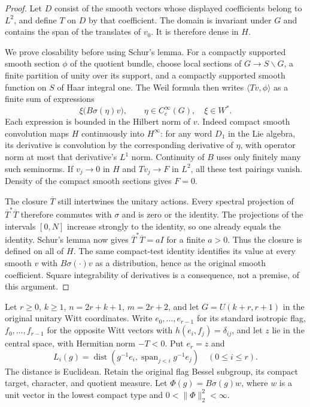 \begin{proof}
Let $D$ consist of the smooth vectors whose displayed coefficients
belong to $L^2$, and define $T$ on $D$ by that coefficient.
The domain is invariant under $G$ and contains the span of the
translates of $v_0$.  It is therefore dense in $H$.

We prove closability before using Schur's lemma.  For a compactly
supported smooth section $\phi$ of the quotient bundle, choose
local sections of $G\to S\backslash G$, a finite partition of
unity over its support, and a compactly supported smooth function
on $S$ of Haar integral one.  The Weil formula then writes
$\langle Tv,\phi\rangle$ as a finite sum of expressions
\[
                 \xi\bigl(B\sigma(\eta)v\bigr),
        \qquad \eta\in C_c^\infty(G),\quad \xi\in W^*.
\]
Each expression is bounded in the Hilbert norm of $v$.
Indeed compact smooth convolution maps $H$ continuously into
$H^\infty$: for any word $D_1$ in the Lie algebra, its derivative
is convolution by the corresponding derivative of $\eta$, with
operator norm at most that derivative's $L^1$ norm.  Continuity
of $B$ uses only finitely many such seminorms.
If $v_j\to0$ in $H$ and $Tv_j\to F$ in $L^2$, all these
test pairings vanish.  Density of the compact smooth sections
gives $F=0$.

The closure $\overline T$ still intertwines the unitary actions.
Every spectral projection of $\overline T^*\overline T$ therefore
commutes with $\sigma$ and is zero or the identity.  The projections
of the intervals $[0,N]$ increase strongly to the identity, so one
already equals the identity.  Schur's lemma now gives
$\overline T^*\overline T=aI$ for a finite $a>0$.
Thus the closure is defined on all of $H$.  The same compact-test
identity identifies its value at every smooth $v$ with
$B\sigma(\cdot)v$ as a distribution, hence as the original smooth
coefficient.  Square integrability of derivatives is a consequence,
not a premise, of this argument.
\end{proof}

Let $r\ge0$, $k\ge1$, $n=2r+k+1$, $m=2r+2$, and let
$G=U(k+r,r+1)$ in the original unitary Witt coordinates.
Write $e_0,\ldots,e_{r-1}$ for its standard isotropic flag,
$f_0,\ldots,f_{r-1}$ for the opposite Witt vectors with
$h(e_i,f_j)=\delta_{ij}$, and let $z$ lie in the central
space, with Hermitian norm $-T<0$.  Put $e_r=z$ and
\[
 L_i(g)=\operatorname{dist}\left(g^{-1}e_i,
                    \operatorname{span}_{j<i}g^{-1}e_j\right)
                       \quad(0\le i\le r).
\]
The distance is Euclidean.  Retain the original flag Bessel
subgroup, its compact target, character, and quotient measure.
Let $\Phi(g)=B\sigma(g)w$, where $w$ is a unit vector in the
lowest compact type and $0<\|\Phi\|_2^2<\infty$.

